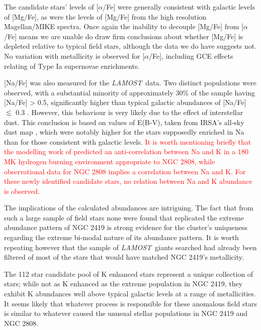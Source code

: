 \documentclass[a4paper,fleqn,usenatbib]{mnras}
\newcommand{\todo}[1]{\textcolor{red}{#1}}
\newcommand{\project}[1]{\emph{#1}}
\newcommand{\lamost}{\project{LAMOST}}
\begin{document}
The candidate stars' levels of [$\alpha$/Fe] were generally consistent with galactic levels of [Mg/Fe], as were the levels of [Mg/Fe] from the high resolution Magellan/MIKE spectra. Once again the inability to decouple [Mg/Fe] from $[\alpha$/Fe] means we are unable do draw firm conclusions about whether [Mg/Fe] is depleted relative to typical field stars, although the data we do have suggests not. No variation with metallicity is observed for [$\alpha$/Fe], including GCE effects relating of Type Ia supernovae enrichments.


[Na/Fe] was also measured for the \lamost\ data. Two distinct populations were observed, with a substantial minority of approximately 30\% of the sample having [Na/Fe] > 0.5, significantly higher than typical galactic abundances of [Na/Fe] $\lesssim$ 0.3 \citep{kobayashi2011}. However, this behaviour is very likely due to the effect of interstellar dust. This conclusion is based on values of E(B-V), taken from IRSA's all-sky dust map \citep{schlafly2011}, which were notably higher for the stars supposedly enriched in Na than for those consistent with galactic levels. \todo{It is worth mentioning briefly that the modelling work of \cite{prantzos2017} predicted an anti-correlation between Na and K in a 180 MK hydrogen burning environment appropriate to NGC 2808, while observational data for NGC 2808 implies a correlation between Na and K. For these newly identified candidate stars, no relation between Na and K abundance is observed.}

The implications of the calculated abundances are intriguing. The fact that from such a large sample of field stars none were found that replicated the extreme abundance pattern of NGC 2419 is strong evidence for the cluster's uniqueness regarding the extreme bi-modal nature of its abundance pattern. It is worth repeating however that the sample of \lamost\ giants searched had already been filtered of most of the stars that would have matched NGC 2419's metallicity.

The 112 star candidate pool of K enhanced stars represent a unique collection of stars; while not as K enhanced as the extreme population in NGC 2419, they exhibit K abundances well above typical galactic levels at a range of metallicities. It seems likely that whatever process is responsible for these anomalous field stars is similar to whatever caused the unusual stellar populations in NGC 2419 and NGC 2808.
\end{document}
